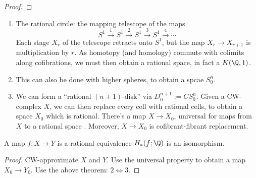 \documentclass[11pt]{article}
\begin{document}
\begin{Jeremy RationalHomotopyPractice}
\begin{proof}
\end{proof}
\begin{exmps*}
\begin{enumerate}\squishlist
\item The rational circle: the mapping telescope of the maps
\[S^1\overset{1}{\to}S^1\overset{2}{\to}S^1\overset{3}{\to}S^1\overset{4}{\to}\cdots\]
Each stage $X_r$ of the telescope retracts onto $S^1$, but the map $X_r\to X_{r+1}$ is multiplication by $r$. As homotopy (and homology) commute with colimits along cofibrations, we must then obtain a rational space, in fact a $K(\Q,1)$.
\item This can also be done with higher spheres, to obtain a spcae $S^n_0$.
\item We can form a ``rational $(n+1)$-disk'' via $D_0^{n+1}:=CS^n_0$. Given a CW-complex $X$, we can then replace every cell with rational cells, to obtain a space $X_0$ which is rational. There's a map $X\to X_0$, universal for maps from $X$ to a rational space . Moreover, $X\to X_0$ is cofibrant-fibrant replacement. 
\end{enumerate}
\end{exmps*}
\begin{thm*}
A map $f:X\to Y$ is a rational equivalence \Iff $H_{*}(f;\Q)$ is an isomorphism.
\end{thm*}
\begin{proof}
CW-approximate $X$ and $Y$. Use the universal property to obtain a map $X_0\to Y_0$. Use the above theorem: $2\iff 3$.
\end{proof}

\end{Jeremy RationalHomotopyPractice}
\end{document}
